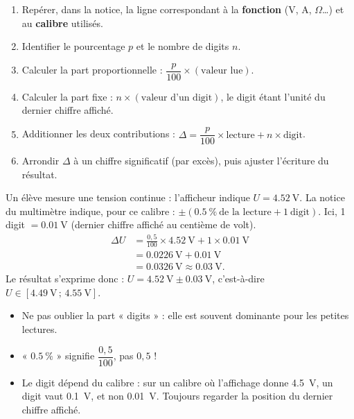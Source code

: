 \documentclass[11pt]{article}
\begin{document}
\begin{methode}
\begin{enumerate}
\item Repérer, dans la notice, la ligne correspondant à la \textbf{fonction} (V, A, $\Omega$\ldots) et au \textbf{calibre} utilisés.
\item Identifier le pourcentage $p$ et le nombre de digits $n$.
\item Calculer la part proportionnelle : $\dfrac{p}{100}\times(\text{valeur lue})$.
\item Calculer la part fixe : $n \times (\text{valeur d'un digit})$, le digit étant l'unité du dernier chiffre affiché.
\item Additionner les deux contributions : $\Delta = \dfrac{p}{100}\times\text{lecture} + n\times\text{digit}$.
\item Arrondir $\Delta$ à un chiffre significatif (par excès), puis ajuster l'écriture du résultat.
\end{enumerate}
\end{methode}

\begin{exemplebox}
Un élève mesure une tension continue : l'afficheur indique $U = \SI{4,52}{\volt}$. La notice du multimètre indique, pour ce calibre : $\pm(\SI{0,5}{\percent}\ \text{de la lecture} + 1\ \text{digit})$. Ici, 1 digit $= \SI{0,01}{\volt}$ (dernier chiffre affiché au centième de volt).
\begin{align*}
\Delta U &= \frac{0,5}{100}\times \SI{4,52}{\volt} + 1\times \SI{0,01}{\volt} \\
&= \SI{0,0226}{\volt} + \SI{0,01}{\volt} \\
&= \SI{0,0326}{\volt} \approx \SI{0,03}{\volt}.
\end{align*}
Le résultat s'exprime donc : $U = \SI{4,52}{\volt} \pm \SI{0,03}{\volt}$, c'est-à-dire $U \in [\SI{4,49}{\volt}\,;\,\SI{4,55}{\volt}]$.
\end{exemplebox}

\begin{attention}
\begin{itemize}
\item Ne pas oublier la part « digits » : elle est souvent dominante pour les petites lectures.
\item « $\SI{0,5}{\percent}$ » signifie $\dfrac{0,5}{100}$, pas $0,5$ !
\item Le digit dépend du calibre : sur un calibre où l'affichage donne \SI{4,5}{\volt}, un digit vaut \SI{0,1}{\volt}, et non \SI{0,01}{\volt}. Toujours regarder la position du dernier chiffre affiché.
\end{itemize}
\end{attention}
\end{document}
